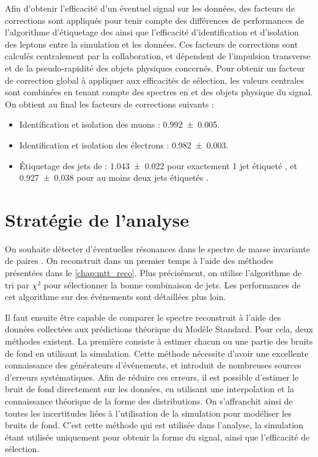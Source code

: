 Afin d'obtenir l'efficacité d'un éventuel signal sur les données, des facteurs de corrections sont appliqués pour tenir compte des différences de performances de l'algorithme d'étiquetage des \Pbottom ainsi que l'efficacité d'identification et d'isolation des leptons entre la simulation et les données. Ces facteurs de corrections sont calculés centralement par la collaboration, et dépendent de l'impulsion transverse et de la pseudo-rapidité des objets physiques concernés. Pour obtenir un facteur de correction global à appliquer aux efficacités de sélection, les valeurs centrales sont combinées en tenant compte des spectres en \pt et \aeta des objets physique du signal. On obtient au final les facteurs de corrections suivants :
\begin{itemize}
  \item Identification et isolation des muons : \num{0.992 \pm 0.005}.
  \item Identification et isolation des électrons : \num{0.982 \pm 0.003}.
  \item Étiquetage des jets de \Pbottom : \num{1.043 \pm 0.022} pour exactement 1 jet étiqueté \Pbottom, et \num{0.927 \pm 0.038} pour au moins deux jets étiquetés \Pbottom.
\end{itemize}

\section{Stratégie de l'analyse}

On souhaite détecter d'éventuelles résonances dans le spectre de masse invariante de paires \ttbar. On reconstruit dans un premier temps \mtt à l'aide des méthodes présentées dans le \cref{chap:mtt_reco}. Plus précisément, on utilise l'algorithme de tri par $\chi^2$ pour sélectionner la bonne combinaison de jets. Les performances de cet algorithme sur des événements \zprime sont détaillées plus loin.

\smallskip

Il faut ensuite être capable de comparer le spectre \mtt reconstruit à l'aide des données collectées aux prédictions théorique du Modèle Standard. Pour cela, deux méthodes existent. La première consiste à estimer chacun ou une partie des bruits de fond en utilisant la simulation. Cette méthode nécessite d'avoir une excellente connaissance des générateurs d'événements, et introduit de nombreuses sources d'erreurs systématiques. Afin de réduire ces erreurs, il est possible d'estimer le bruit de fond directement sur les données, en utilisant une interpolation et la connaissance théorique de la forme des distributions. On s'affranchit ainsi de toutes les incertitudes liées à l'utilisation de la simulation pour modéliser les bruits de fond. C'est cette méthode qui est utilisée dans l'analyse, la simulation étant utilisée uniquement pour obtenir la forme du signal, ainsi que l'efficacité de sélection.

